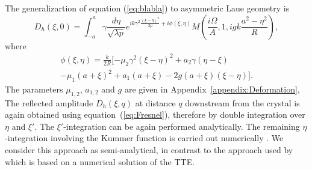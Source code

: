 \documentclass[preprint]{iucr}              %
\newcommand{\inred}[1]{{\color{red}#1}}
\begin{document}
 \inred{The generalizartion of equation (\ref{eq:blabla}) to asymmetric Laue geometry is \cite{GuigayFerrero2016}}
\begin{equation}
\label{eq:unpropagatedkummer}
    D_h(\xi,0) = 
    \int_{-a}^{a} \gamma\frac{d\eta}{\sqrt{\lambda p}}
    e^{i k \gamma^2
    \frac{(\xi-\eta)^2}{2p}+i \phi(\xi,\eta)
    }
     M(\frac{i\Omega}{A},1,i g k \frac{a^2-\eta^2}{R}),
\end{equation}
where 
\begin{multline}
    \phi(\xi,\eta) =\frac{k}{2R}[-\mu_2\gamma^2(\xi-\eta)^2
    +a_2\gamma(\eta-\xi) \\
    -\mu_1(a+\xi)^2 
    +a_1(a+\xi)
    -2g(a+\xi)(\xi-\eta)].
\end{multline}
The parameters $\mu_{1,2}$, $a_{1,2}$ \inred{and $g$} are given in Appendix~\ref{appendix:Deformation},
The reflected amplitude $D_h(\xi,q)$ at distance $q$ downstream \inred{from} the crystal is again obtained using equation~(\ref{eq:Fresnel}), therefore by double integration over $\eta$ and $\xi'$. The $\xi'$-integration can be again performed analytically. The remaining $\eta$-integration involving the Kummer function is carried out numerically \cite{GuigayFerrero2016}. We consider this approach as semi-analytical, in contrast to the approach used by \cite{Nesterets} which is based on a numerical solution of the TTE.
\end{document}
